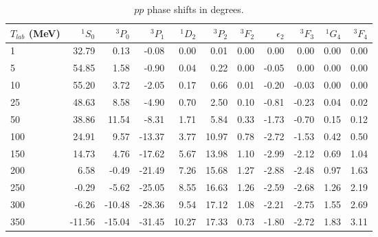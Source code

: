\begin{table}
\caption{$pp$ phase shifts in degrees.}
\begin{tabular}{lrrrrrrrrrr}
 $T_{lab}$ (MeV)
 & $^1S_0$
 & $^3P_0$
 & $^3P_1$
 & $^1D_2$
 & $^3P_2$
 & $^3F_2$
 & $\epsilon_2$
 & $^3F_3$
 & $^1G_4$
 & $^3F_4$
\\
 \hline 
    1 &  32.79 &   0.13 &  -0.08 &   0.00 &   0.01 &   0.00 &   0.00 &   0.00 &   0.00 &   0.00 \\
    5 &  54.85 &   1.58 &  -0.90 &   0.04 &   0.22 &   0.00 &  -0.05 &   0.00 &   0.00 &   0.00 \\
   10 &  55.20 &   3.72 &  -2.05 &   0.17 &   0.66 &   0.01 &  -0.20 &  -0.03 &   0.00 &   0.00 \\
   25 &  48.63 &   8.58 &  -4.90 &   0.70 &   2.50 &   0.10 &  -0.81 &  -0.23 &   0.04 &   0.02 \\
   50 &  38.86 &  11.54 &  -8.31 &   1.71 &   5.84 &   0.33 &  -1.73 &  -0.70 &   0.15 &   0.12 \\
  100 &  24.91 &   9.57 & -13.37 &   3.77 &  10.97 &   0.78 &  -2.72 &  -1.53 &   0.42 &   0.50 \\
  150 &  14.73 &   4.76 & -17.62 &   5.67 &  13.98 &   1.10 &  -2.99 &  -2.12 &   0.69 &   1.04 \\
  200 &   6.58 &  -0.49 & -21.49 &   7.26 &  15.68 &   1.27 &  -2.88 &  -2.48 &   0.97 &   1.63 \\
  250 &  -0.29 &  -5.62 & -25.05 &   8.55 &  16.63 &   1.26 &  -2.59 &  -2.68 &   1.26 &   2.19 \\
  300 &  -6.26 & -10.48 & -28.36 &   9.54 &  17.12 &   1.08 &  -2.21 &  -2.75 &   1.55 &   2.69 \\
  350 & -11.56 & -15.04 & -31.45 &  10.27 &  17.33 &   0.73 &  -1.80 &  -2.72 &   1.83 &   3.11 \\
\end{tabular}
\label{tab_phpp}
\end{table}

\vspace*{5cm}


